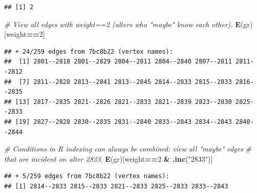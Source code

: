 \documentclass[
]{book}
\newenvironment{Shaded}{\begin{snugshade}}{\end{snugshade}}
\newcommand{\CommentTok}[1]{\textcolor[rgb]{0.56,0.35,0.01}{\textit{#1}}}
\newcommand{\DecValTok}[1]{\textcolor[rgb]{0.00,0.00,0.81}{#1}}
\newcommand{\FunctionTok}[1]{\textcolor[rgb]{0.13,0.29,0.53}{\textbf{#1}}}
\newcommand{\NormalTok}[1]{#1}
\newcommand{\SpecialCharTok}[1]{\textcolor[rgb]{0.81,0.36,0.00}{\textbf{#1}}}
\newcommand{\StringTok}[1]{\textcolor[rgb]{0.31,0.60,0.02}{#1}}
\begin{document}
\begin{verbatim}
## [1] 2
\end{verbatim}

\begin{Shaded}
\begin{Highlighting}[]
\CommentTok{\# View all edges with weight==2 (alters who "maybe" know each other).}
\FunctionTok{E}\NormalTok{(gr)[weight}\SpecialCharTok{==}\DecValTok{2}\NormalTok{] }
\end{Highlighting}
\end{Shaded}

\begin{verbatim}
## + 24/259 edges from 7bc8b22 (vertex names):
##  [1] 2801--2818 2801--2829 2804--2811 2804--2840 2807--2811 2811--2812
##  [7] 2811--2828 2813--2841 2813--2845 2814--2833 2815--2833 2816--2835
## [13] 2817--2835 2821--2826 2821--2833 2821--2839 2823--2830 2825--2833
## [19] 2827--2828 2830--2835 2831--2840 2833--2843 2834--2843 2840--2844
\end{verbatim}

\begin{Shaded}
\begin{Highlighting}[]
\CommentTok{\# Conditions in R indexing can always be combined: view all "maybe" edges}
\CommentTok{\# that are incident on alter 2833.}
\FunctionTok{E}\NormalTok{(gr)[weight}\SpecialCharTok{==}\DecValTok{2} \SpecialCharTok{\&} \FunctionTok{.inc}\NormalTok{(}\StringTok{"2833"}\NormalTok{)]}
\end{Highlighting}
\end{Shaded}

\begin{verbatim}
## + 5/259 edges from 7bc8b22 (vertex names):
## [1] 2814--2833 2815--2833 2821--2833 2825--2833 2833--2843
\end{verbatim}

\begin{Shaded}
\end{Shaded}
\end{document}
